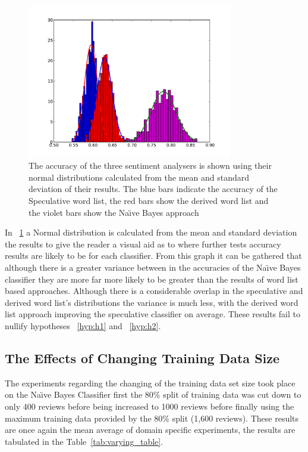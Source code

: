 \documentclass{llncs}
\begin{document}
\begin{figure}
    \begin{center}%
    \includegraphics[width=0.8\textwidth]{three_classifiers.pdf}
    \caption{The accuracy of the three sentiment analysers is shown using their normal distributions calculated from the mean and standard deviation of their results. The blue bars indicate the accuracy of the Speculative word list, the red bars show the derived word list and the violet bars show the Na\"\i ve Bayes approach}
    \label{fig:three_classifiers}
    \end{center}
\end{figure}

In ~\ref{fig:three_classifiers} a Normal distribution is calculated from the mean and standard deviation the results to give the reader a visual aid as to where further tests accuracy results are likely to be for each classifier. From this graph it can be gathered that although there is a greater variance between in the accuracies of the Na\"\i ve Bayes classifier they are more far more likely to be greater than the results of word list based approaches. Although there is a considerable overlap in the speculative and derived word list's distributions the variance is much less, with the derived word list approach improving the speculative classifier on average. These results fail to nullify hypotheses ~\ref{hyp:h1} and ~\ref{hyp:h2}.

\subsection{The Effects of Changing Training Data Size}

The experiments regarding the changing of the training data set size took place on the Na\"\i ve Bayes Classifier first the 80\% split of training data was cut down to only 400 reviews before being increased to 1000 reviews before finally using the maximum training data provided by the 80\% split (1,600 reviews). These results are once again the mean average of domain specific experiments, the results are tabulated in the Table~\ref{tab:varying_table}.
\end{document}
